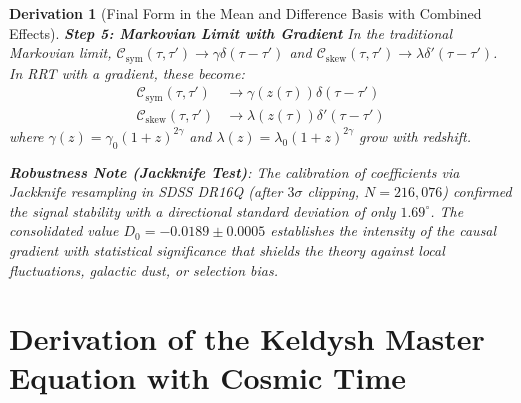 \documentclass[10pt, a4paper]{article}
\newtheorem{derivation}{Derivation}
\begin{document}
\begin{derivation}[Final Form in the Mean and Difference Basis with Combined Effects]
\textbf{Step 5: Markovian Limit with Gradient}
In the traditional Markovian limit, $\mathcal{C}_{\text{sym}}(\tau,\tau') \rightarrow \gamma \delta(\tau-\tau')$ and $\mathcal{C}_{\text{skew}}(\tau,\tau') \rightarrow \lambda \delta'(\tau-\tau')$. In RRT with a gradient, these become:
\begin{align}
\mathcal{C}_{\text{sym}}(\tau,\tau') &\rightarrow \gamma(z(\tau)) \delta(\tau-\tau')
\tag{22.4} \\
\mathcal{C}_{\text{skew}}(\tau,\tau') &\rightarrow \lambda(z(\tau)) \delta'(\tau-\tau')
\tag{22.5}
\end{align}
where $\gamma(z) = \gamma_0 (1+z)^{2\gamma}$ and $\lambda(z) = \lambda_0 (1+z)^{2\gamma}$ grow with redshift.

\textbf{Robustness Note (Jackknife Test)}: The calibration of coefficients via Jackknife resampling in SDSS DR16Q (after $3\sigma$ clipping, $N=216,076$) confirmed the signal stability with a directional standard deviation of only $1.69^\circ$. The consolidated value $D_0 = -0.0189 \pm 0.0005$ establishes the intensity of the causal gradient with statistical significance that shields the theory against local fluctuations, galactic dust, or selection bias.
\end{derivation}

\section{Derivation of the Keldysh Master Equation with Cosmic Time}
\end{document}

